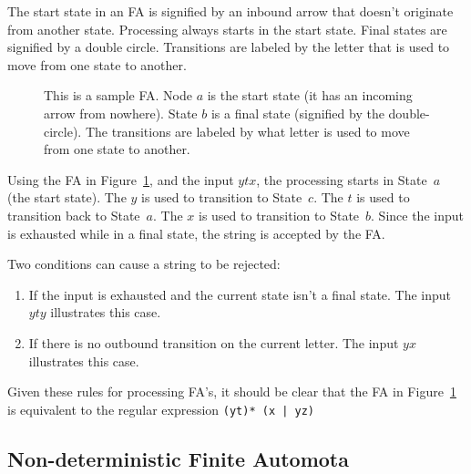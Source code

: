\documentclass[letterpaper,12pt,openany,reqno]{book}%
\newcommand{\faterminalnode}[3] {\draw (#1) circle [radius=9pt]; \node at (#1) (#2) [circle, draw, minimum size=24pt] {#2};}
\newcommand{\fastart}[1] {\coordinate (start) at (#1);}
\newcommand{\fanonterminalnode}[2] {\node at (#1) (#2) [circle, draw, minimum size=24pt] {#2};}
\newcommand{\fatransition}[3] {\draw [->] (#1) -- (#2) node [midway, above] {#3};}
\newcommand{\faarctransition}[5] {\draw [->] (#1) to[out=#4, in=#5] node  [midway, above] {#3} (#2) ;}
\begin{document}
The start state in an FA is signified by an inbound arrow that doesn't originate from another state. Processing always starts in the start state. Final states are signified by a double circle. Transitions are labeled by the letter that is used to move from one state to another. 

\begin{figure}[hbt]
\centering
{}
 \caption[Sample Finite Automaton]{This is a sample FA. Node $a$ is the start state (it has an incoming arrow from nowhere). State $b$ is a final state (signified by the double-circle). The transitions are labeled by what letter is used to move from one state to another.}
  \label{F.FA_1}
\end{figure}

Using the FA in Figure~\ref{F.FA_1}, and the input $ytx$, the processing starts in State~$a$ (the start state). The $y$ is used to transition to State~$c$. The $t$ is used to transition back to State~$a$. The $x$ is used to transition to State~$b$. Since the input is exhausted while in a final state, the string is accepted by the FA.

Two conditions can cause a string to be rejected: 
\begin{enumerate}
\item If the input is exhausted and the current state isn't a final state. The input $yty$ illustrates this case.
\item If there is no outbound transition on the current letter. The input $yx$ illustrates this case.
\end{enumerate}

Given these rules for processing FA's, it should be clear that the FA in Figure~\ref{F.FA_1} is equivalent to the regular expression \texttt{(yt)* (x | yz)}

\subsection{Non-deterministic Finite Automota}
\end{document}
